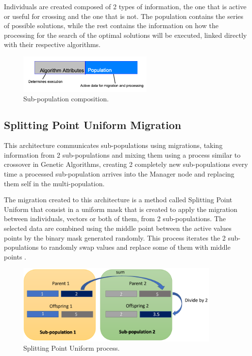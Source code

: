 \documentclass[runningheads]{llncs}
\begin{document}
Individuals are created composed of 2 types of information, the one that is
active or useful for crossing and the one that is not. The population contains
the series of possible solutions, while the rest contains the information on how
the processing for the search of the optimal solutions will be executed, linked
directly with their respective algorithms.

\begin{figure}[htp]
  \centering
  \includegraphics[width=0.6\textwidth]{img/subpopulationDefinition.png}
  \caption{Sub-population composition.} \label{fig3}
  \end{figure}

\subsection{Splitting Point Uniform Migration}

This architecture communicates sub-populations using migrations, taking information from 2 sub-populations and mixing them 
using a process similar to crossover in Genetic Algorithms, creating 2 completely new sub-populations
every time a processed sub-population arrives into the Manager node and replacing them self in the multi-population.

The migration created to this architecture is a method called Splitting Point Uniform that consist in a 
uniform mask that is created to apply the migration between individuals, vectors or both of them, from 2
sub-populations. The selected data are combined using the middle point between
the active values points by the binary mask generated randomly. This process iterates the 2 sub-populations to
randomly swap values and replace some of them with middle points \cite{Kramer2017,Kaya2011}.


\begin{figure}[htp]
  \centering
  \includegraphics[width=0.9\textwidth]{img/splittinPointUniform.png}
  \caption{Splitting Point Uniform process.} \label{fig4}
  \end{figure}
\end{document}
